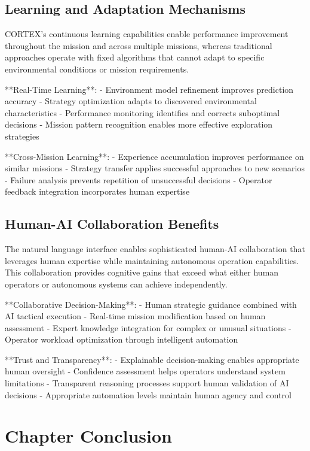 \subsection{Learning and Adaptation Mechanisms}

CORTEX's continuous learning capabilities enable performance improvement throughout the mission and across multiple missions, whereas traditional approaches operate with fixed algorithms that cannot adapt to specific environmental conditions or mission requirements.

**Real-Time Learning**:
- Environment model refinement improves prediction accuracy
- Strategy optimization adapts to discovered environmental characteristics
- Performance monitoring identifies and corrects suboptimal decisions
- Mission pattern recognition enables more effective exploration strategies

**Cross-Mission Learning**:
- Experience accumulation improves performance on similar missions
- Strategy transfer applies successful approaches to new scenarios
- Failure analysis prevents repetition of unsuccessful decisions
- Operator feedback integration incorporates human expertise

\subsection{Human-AI Collaboration Benefits}

The natural language interface enables sophisticated human-AI collaboration that leverages human expertise while maintaining autonomous operation capabilities. This collaboration provides cognitive gains that exceed what either human operators or autonomous systems can achieve independently.

**Collaborative Decision-Making**:
- Human strategic guidance combined with AI tactical execution
- Real-time mission modification based on human assessment
- Expert knowledge integration for complex or unusual situations
- Operator workload optimization through intelligent automation

**Trust and Transparency**:
- Explainable decision-making enables appropriate human oversight
- Confidence assessment helps operators understand system limitations
- Transparent reasoning processes support human validation of AI decisions
- Appropriate automation levels maintain human agency and control

\section{Chapter Conclusion}

